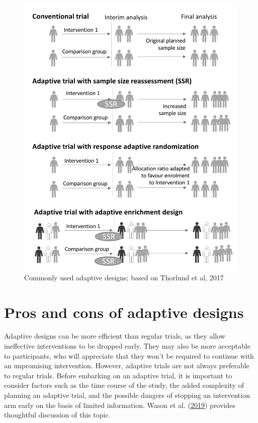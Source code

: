 \documentclass{krantz}
\begin{document}
\begin{figure}

{\centering \includegraphics[width=0.9\linewidth]{images_bw/AdaptiveInfographic} 

}

\caption{Commonly used adaptive designs; based on Thorlund et al, 2017}\label{fig:adaptivefig}
\end{figure}

\hypertarget{pros-and-cons-of-adaptive-designs}{%
\section{Pros and cons of adaptive designs}\label{pros-and-cons-of-adaptive-designs}}

Adaptive designs can be more efficient than regular trials, as they allow ineffective interventions to be dropped early. They may also be more acceptable to participants, who will appreciate that they won't be required to continue with an unpromising intervention. However, adaptive trials are not always preferable to regular trials. Before embarking on an adaptive trial, it is important to consider factors such as the time course of the study, the added complexity of planning an adaptive trial, and the possible dangers of stopping an intervention arm early on the basis of limited information. Wason et al. (\protect\hyperlink{ref-wason2019}{2019}) provides thoughtful discussion of this topic.
\end{document}
